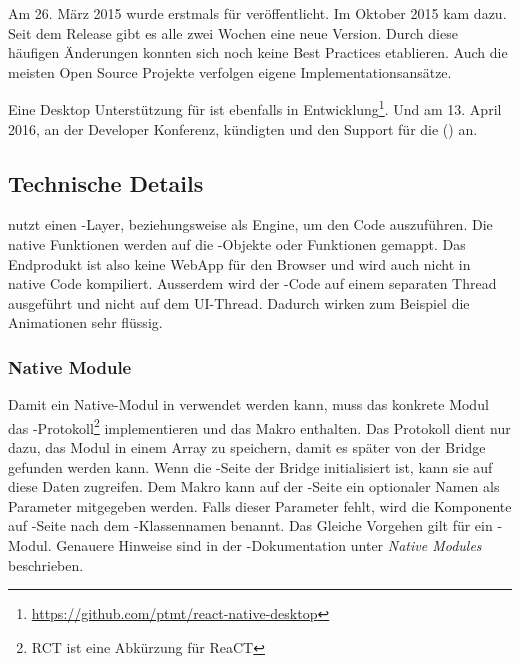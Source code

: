 Am 26. März 2015 wurde  erstmals für  veröffentlicht.
Im Oktober 2015 kam  dazu.\cite{react-native-release}
Seit dem Release gibt es alle zwei Wochen eine neue Version. 
Durch diese häufigen Änderungen konnten sich noch keine Best Practices etablieren. 
Auch die meisten Open Source Projekte verfolgen eigene Implementationsansätze.

Eine Desktop Unterstützung für  ist ebenfalls in Entwicklung\footnote{\url{https://github.com/ptmt/react-native-desktop}}. 
Und am 13. April 2016, an der  Developer Konferenz, kündigten  und  den Support für die  () an.\cite{react-native-windows}


\subsection{Technische Details}
 nutzt einen -Layer, beziehungsweise  als Engine, um den Code auszuführen.\cite{react-native-javascriptcore} 
Die native Funktionen werden auf die -Objekte oder Funktionen gemappt. 
Das Endprodukt ist also keine \gls{WebApp} für den Browser und wird auch nicht in native Code kompiliert. 
Ausserdem wird der -Code auf einem separaten Thread ausgeführt und nicht auf dem UI-Thread. 
Dadurch wirken zum Beispiel die Animationen sehr flüssig.\cite{react-native-javascript-thread}


\subsubsection{Native Module}
Damit ein  Native-Modul in  verwendet werden kann, muss das konkrete Modul das \newline{}-Protokoll\footnote{RCT ist eine Abkürzung für ReaCT} implementieren und das Makro \newline{} enthalten. 
Das Protokoll dient nur dazu, das Modul in einem Array zu speichern, damit es später von der Bridge gefunden werden kann. 
Wenn die -Seite der Bridge initialisiert ist, kann sie auf diese Daten zugreifen. 
Dem Makro kann auf der -Seite ein optionaler Namen als Parameter mitgegeben werden. 
Falls dieser Parameter fehlt, wird die Komponente auf -Seite nach dem -Klassennamen benannt. 
Das Gleiche Vorgehen gilt für ein -Modul. 
Genauere Hinweise sind in der -Dokumentation unter \textit{Native Modules} beschrieben.\cite{react-native-module-ios}

